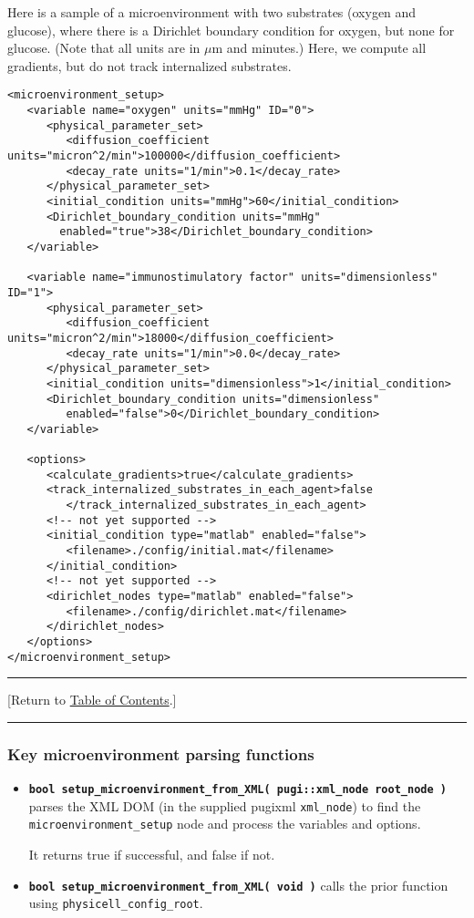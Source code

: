 \documentclass[12pt]{article}
\newcommand{\micron}{\mu\textrm{m}}
\newcommand{\smallcode}[1]{\textbf{\texttt{#1}}}
\newcommand{\TOClink}{\begin{center}\hrule\vskip-5pt\phantom{.}\hfill[Return to \hyperlink{TOC}{Table of Contents}.]\hfill\phantom{.}\vskip3pt\hrule\end{center}}
\begin{document}
Here is a sample of a microenvironment with two substrates (oxygen and glucose), 
where there is a Dirichlet boundary condition for oxygen, but none for glucose. 
(Note that all units are in $\micron$ and minutes.) Here, we compute all gradients, 
but do not track internalized substrates.  
\begin{verbatim}
<microenvironment_setup>
   <variable name="oxygen" units="mmHg" ID="0">
      <physical_parameter_set>
         <diffusion_coefficient units="micron^2/min">100000</diffusion_coefficient>
         <decay_rate units="1/min">0.1</decay_rate>  
      </physical_parameter_set>
      <initial_condition units="mmHg">60</initial_condition>
      <Dirichlet_boundary_condition units="mmHg" 
        enabled="true">38</Dirichlet_boundary_condition>
   </variable>
   
   <variable name="immunostimulatory factor" units="dimensionless" ID="1">
      <physical_parameter_set>
         <diffusion_coefficient units="micron^2/min">18000</diffusion_coefficient>
         <decay_rate units="1/min">0.0</decay_rate>  
      </physical_parameter_set>
      <initial_condition units="dimensionless">1</initial_condition>
      <Dirichlet_boundary_condition units="dimensionless"
         enabled="false">0</Dirichlet_boundary_condition>
   </variable>      

   <options>
      <calculate_gradients>true</calculate_gradients>
      <track_internalized_substrates_in_each_agent>false
         </track_internalized_substrates_in_each_agent>
      <!-- not yet supported --> 
      <initial_condition type="matlab" enabled="false">
         <filename>./config/initial.mat</filename>
      </initial_condition>
      <!-- not yet supported --> 
      <dirichlet_nodes type="matlab" enabled="false">
         <filename>./config/dirichlet.mat</filename>
      </dirichlet_nodes>
   </options>
</microenvironment_setup>    
\end{verbatim}

\TOClink 

\subsubsection{Key microenvironment parsing functions}
\label{sec:microenvironment_xml_parsing_functions}

\begin{itemize}
\item \smallcode{bool setup\_microenvironment\_from\_XML( pugi::xml\_node root\_node )} 
parses the XML DOM (in the supplied pugixml \verb+xml_node+) to find 
the \verb+microenvironment_setup+ node and process the variables and 
options. 

It returns true if successful, and false if not. 

\item \smallcode{bool setup\_microenvironment\_from\_XML( void )} calls the 
prior function using \hfill\newline \verb+physicell_config_root+.   
\end{itemize}
\end{document}
